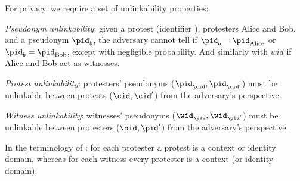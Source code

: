 For privacy, we require a set of unlinkability properties:%
\label{privacy-properties}
\begin{requirements}[P]
\item\label{PseudonymUnlink} \emph{Pseudonym unlinkability}: given a protest 
  (identifier \cid), protesters Alice and Bob, and a pseudonym \(\pid_b\), the 
  adversary cannot tell if \(\pid_b = \pid_{\text{Alice}}\) or \(\pid_b = 
    \pid_{\text{Bob}}\), except with negligible probability. And similarly with $wid$ if Alice and Bob act as witnesses.
\item\label{ProtestUnlink} \emph{Protest unlinkability}: protesters' pseudonyms 
  (\(\pid_{\cid}, \pid_{\cid'}\)) must be unlinkable between protests (\(\cid, 
  \cid'\)) from the adversary's perspective.
\item\label{WitnessUnlink}\emph{Witness unlinkability}:  witnesses' pseudonyms 
  (\(\wid_{\pid}, \wid_{\pid'}\)) must be unlinkable between protesters 
  (\(\pid, \pid'\)) from the adversary's perspective.
\end{requirements}

In the terminology of \textcite{SybilFreePseudonyms}; for each protester a 
protest is a context or identity domain, whereas for each witness every 
protester is a context (or identity domain).
